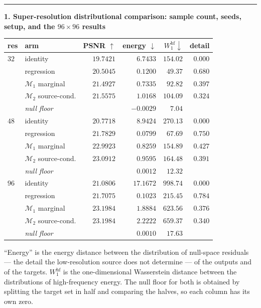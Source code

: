 \documentclass[11pt]{article}
\newcommand{\M}{\mathcal M}
\newenvironment{item12}[1]{%
  \par\medskip\noindent\rule{\textwidth}{0.7pt}\par\nobreak\smallskip
  \noindent\textbf{\large #1}\par\nobreak\smallskip
}{\par\medskip}
\begin{document}
\begin{item12}{1. Super-resolution distributional comparison: sample count, seeds, setup, and
the $96\times96$ results}
\begin{center}
\footnotesize
\begin{tabular}{@{}llrrrr@{}}
\toprule
res & arm & PSNR $\uparrow$ & energy $\downarrow$ & $W_1^{\mathrm{hf}}\downarrow$ & detail\\
\midrule
$32$ & identity            & $19.7421$ & $6.7433$ & $154.02$ & $0.000$\\
     & regression          & $20.5045$ & $0.1200$ & $49.37$  & $0.680$\\
     & $\M_1$ marginal     & $21.4927$ & $0.7335$ & $92.82$  & $0.397$\\
     & $\M_2$ source-cond. & $21.5575$ & $1.0168$ & $104.09$ & $0.324$\\
     & \emph{null floor}   &           & $-0.0029$ & $7.04$  & \\
\midrule
$48$ & identity            & $20.7718$ & $8.9424$ & $270.13$ & $0.000$\\
     & regression          & $21.7829$ & $0.0799$ & $67.69$  & $0.750$\\
     & $\M_1$ marginal     & $22.9923$ & $0.8259$ & $154.89$ & $0.427$\\
     & $\M_2$ source-cond. & $23.0912$ & $0.9595$ & $164.48$ & $0.391$\\
     & \emph{null floor}   &           & $0.0012$ & $12.32$  & \\
\midrule
$96$ & identity            & $21.0806$ & $17.1672$ & $998.74$ & $0.000$\\
     & regression          & $21.7075$ & $0.1023$  & $215.45$ & $0.784$\\
     & $\M_1$ marginal     & $23.1984$ & $1.8884$  & $623.56$ & $0.376$\\
     & $\M_2$ source-cond. & $23.1984$ & $2.2222$  & $659.37$ & $0.340$\\
     & \emph{null floor}   &           & $0.0010$  & $17.63$  & \\
\bottomrule
\end{tabular}
\end{center}

``Energy'' is the energy distance between the distribution of null-space residuals --- the
detail the low-resolution source does not determine --- of the outputs and of the targets.
$W_1^{\mathrm{hf}}$ is the one-dimensional Wasserstein distance between the distributions of
high-frequency energy. The null floor for both is obtained by splitting the target set in half
and comparing the halves, so each column has its own zero.


\end{item12}
\end{document}
